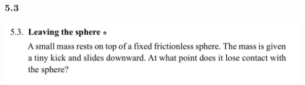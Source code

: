\subsubsection*{5.3}
\begin{mdframed}
  \includegraphics[width=400pt]{img/physics--classical-mechanics--morin--5-3.png}
\end{mdframed}

